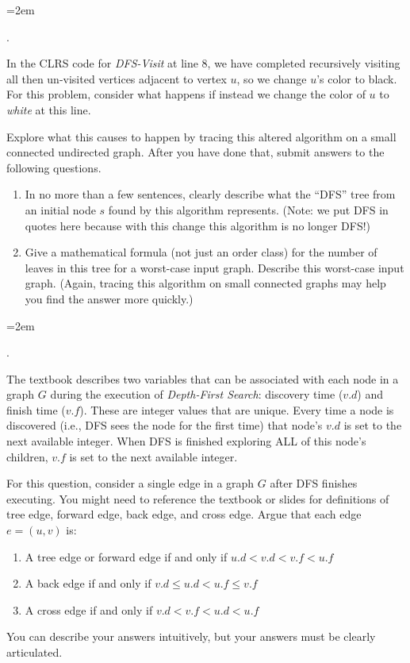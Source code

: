 \documentclass[12pt]{article}
\newcounter{quesnum}
\newcommand{\question}[2][??]{
\begin{list}{\labelitemi}{\leftmargin=2em}
\item [\arabic{quesnum}.] {#2}
\end{list}
\addtocounter{quesnum}{1}
}
\begin{document}
\question[1]{
In the CLRS code for {\em DFS-Visit} at line 8,  we have completed recursively visiting all then un-visited vertices adjacent to vertex $u$, so we change $u$'s color to black.  For this problem, consider what happens if instead we change the color of $u$ to {\em white} at this line.

Explore what this causes to happen by tracing this altered algorithm on a small connected undirected graph.  After you have done that, submit answers to the following questions.

\begin{enumerate}
\renewcommand{\theenumi}{\Alph{enumi}}
\item In no more than a few sentences, clearly describe what the ``DFS'' tree from an initial node $s$ found by this algorithm represents.  (Note:  we put DFS in quotes here because with this change this algorithm is no longer DFS!)
\item Give a mathematical formula (not just an order class) for the number of leaves in this tree for a worst-case input graph.  Describe this worst-case input graph.  (Again, tracing this algorithm on small connected graphs may help you find the answer more quickly.)
\end{enumerate}

}

\question[1]{
The textbook describes two variables that can be associated with each node in a graph $G$ during the execution of \emph{Depth-First Search}: discovery time ($v.d$) and finish time ($v.f$). These are integer values that are unique. Every time a node is discovered (i.e., DFS sees the node for the first time) that node's $v.d$ is set to the next available integer. When DFS is finished exploring ALL of this node's children, $v.f$ is set to the next available integer.

For this question, consider a single edge in a graph $G$ after DFS finishes executing. You might need to reference the textbook or slides for definitions of tree edge, forward edge, back edge, and cross edge. Argue that each edge $e=(u,v)$ is:

\begin{enumerate}
\item A tree edge or forward edge if and only if $u.d < v.d < v.f < u.f$
\item A back edge if and only if $v.d \leq u.d < u.f \leq v.f$
\item A cross edge if and only if $v.d < v.f < u.d < u.f$
\end{enumerate}

You can describe your answers intuitively, but your answers must be clearly articulated.
}
\end{document}
